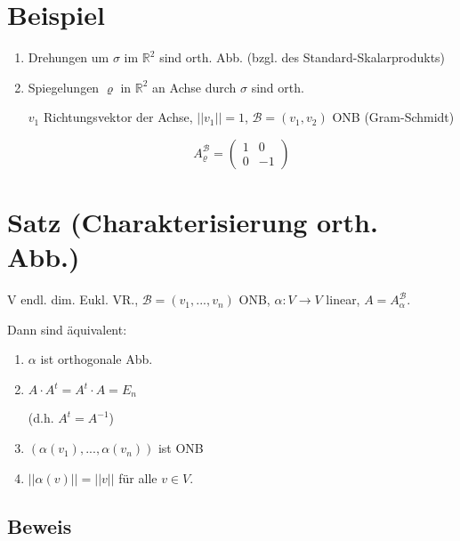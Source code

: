 \documentclass[a4paper, openany]{book}
\begin{document}
        \section{Beispiel}

        \begin{enumerate}[label=(\alph*)]
          \item Drehungen um $\sigma$ im $\mathbb{R}^2$ sind orth. Abb. (bzgl. des Standard-Skalarprodukts)

          \item Spiegelungen $\varrho$ in $\mathbb{R}^2$ an Achse durch $\sigma$ sind orth.

          $v_1$ Richtungsvektor der Achse, $||v_1|| = 1$, $\mathcal{B} = (v_1, v_2)$ ONB (Gram-Schmidt)

          \[ A_{\varrho}^{\mathcal{B}} = \begin{pmatrix}1 & 0 \\ 0 & -1 \end{pmatrix} \]
        \end{enumerate}

        \section{Satz (Charakterisierung orth. Abb.)}

        V endl. dim. Eukl. VR., $\mathcal{B} = (v_1, ..., v_n)$ ONB, $\alpha: V \rightarrow V$ linear, $A = A_{\alpha}^{\mathcal{B}}$. 

        Dann sind äquivalent:

        \begin{enumerate} 
          \item $\alpha$ ist orthogonale Abb.

          \item $A \cdot A^t = A^t \cdot A = E_n$

          (d.h. $A^t = A^{-1}$)

          \item $(\alpha(v_1), ..., \alpha(v_n))$ ist ONB

          \item $||\alpha(v)|| = ||v||$ für alle $v \in V$.

        \end{enumerate}

        \subsection{Beweis}
\end{document}

